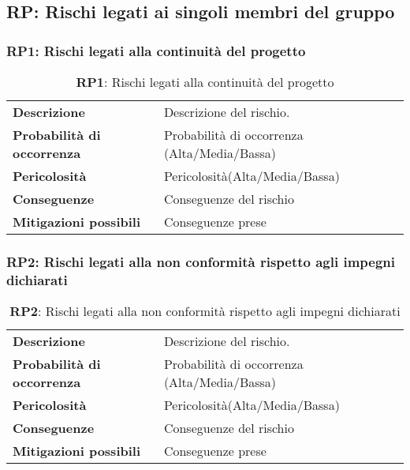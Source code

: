 \newpage

\subsection{RP: Rischi legati ai singoli membri del gruppo}

\subsubsection{RP1: Rischi legati alla continuità del progetto}
\begin{table}[h!]
    \centering
    \renewcommand{\arraystretch}{1.5} %
    \begin{tabularx}{\textwidth}{|X|X|}\hline
    \rowcolor[HTML]{FFD700} 
    \multicolumn{2}{|c|}{\textbf{Rischi legati alla continuità del progetto}} \\ \hline
    \textbf{Descrizione} & Descrizione del rischio. \\ \hline
    \textbf{Probabilità di occorrenza} & Probabilità di occorrenza (Alta/Media/Bassa) \\ \hline
    \textbf{Pericolosità} & Pericolosità(Alta/Media/Bassa) \\ \hline
    \textbf{Conseguenze} & Conseguenze del rischio \\ \hline
    \textbf{Mitigazioni possibili} & Conseguenze prese \\ \hline
    \end{tabularx}
    \caption{\textbf{RP1}: Rischi legati alla continuità del progetto}
    \end{table}

\subsubsection{RP2: Rischi legati alla non conformità rispetto agli impegni dichiarati}
\begin{table}[h!]
    \centering
    \renewcommand{\arraystretch}{1.5} %
    \begin{tabularx}{\textwidth}{|X|X|}\hline
    \rowcolor[HTML]{FFD700} 
    \multicolumn{2}{|c|}{\textbf{Rischi legati alla non conformità rispetto agli impegni dichiarati}} \\ \hline
    \textbf{Descrizione} & Descrizione del rischio. \\ \hline
    \textbf{Probabilità di occorrenza} & Probabilità di occorrenza (Alta/Media/Bassa) \\ \hline
    \textbf{Pericolosità} & Pericolosità(Alta/Media/Bassa) \\ \hline
    \textbf{Conseguenze} & Conseguenze del rischio \\ \hline
    \textbf{Mitigazioni possibili} & Conseguenze prese \\ \hline
    \end{tabularx}
    \caption{\textbf{RP2}: Rischi legati alla non conformità rispetto agli impegni dichiarati}
    \end{table}

